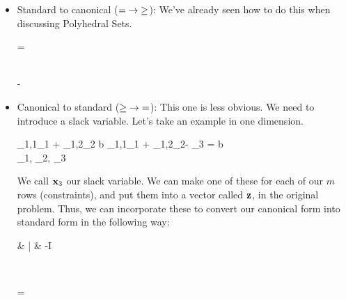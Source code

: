\begin{itemize}
	\item Standard to canonical ($= \; \rightarrow \; \geq$):
		We've already seen how to do this when discussing Polyhedral Sets.
		\begin{frml}
			\vA\vx = \vb \rarrw 
			\begin{bmatrix} \vA \\ -\vA \end{bmatrix} \vx \geq \vb
		\end{frml}

	\item Canonical to standard ($\geq \; \rightarrow \; =$):
		This one is less obvious. We need to introduce a slack variable.
		Let's take an example in one dimension.
		\begin{frml}
			\vA_{1,1}\vx_1 + \vA_{1,2}\vx_2 \geq b \rarrw
			\vA_{1,1}\vx_1 + \vA_{1,2}\vx_2- \vx_3 = b  \\
			\st \vx_1, \vx_2, \vx_3 \geq 0
		\end{frml}

		We call $\mathbf{x}_3$ our slack variable. We can make one of these for each
		of our $m$ rows (constraints), and put them into a vector called $\mathbf{z}$,
		in the original problem.
		Thus, we can incorporate these to convert our canonical form into 
		standard form in the following way:
		\begin{frml}
			\vA \vx \ge \vb \rarrw 
			\begin{bmatrix} \vA & | & -I \end{bmatrix}
			\begin{bmatrix} \vx \\ \vz \end{bmatrix}
			= \vb
		\end{frml}

\end{itemize}

